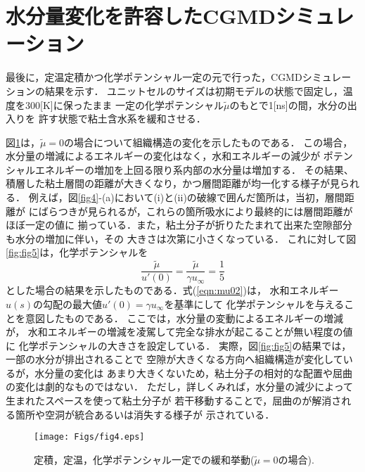\section{水分量変化を許容したCGMDシミュレーション}
最後に，定温定積かつ化学ポテンシャル一定の元で行った，CGMDシミュレーションの結果を示す．
ユニットセルのサイズは初期モデルの状態で固定し，温度を300[K]に保ったまま
一定の化学ポテンシャル$\tilde \mu$のもとで1[ns]の間，水分の出入りを
許す状態で粘土含水系を緩和させる．

図\ref{fig:fig4}は，$\tilde \mu=0$の場合について組織構造の変化を示したものである．
この場合，水分量の増減によるエネルギーの変化はなく，水和エネルギーの減少が
ポテンシャルエネルギーの増加を上回る限り系内部の水分量は増加する．
その結果、積層した粘土層間の距離が大きくなり，かつ層間距離が均一化する様子が見られる．
例えば，図\ref{fig4}-(a)において(i)と(ii)の破線で囲んだ箇所は，当初，層間距離が
にばらつきが見られるが，これらの箇所吸水により最終的には層間距離がほぼ一定の値に
揃っている．また，粘土分子が折りたたまれて出来た空隙部分も水分の増加に伴い，その
大きさは次第に小さくなっている．
%
これに対して図\ref{fig:fig5}は，化学ポテンシャルを
\begin{equation}
	\frac{\tilde \mu}{u'(0)}=
	\frac{\tilde \mu}{\gamma u_\infty}=\frac{1}{5}
	\label{eqn:mu02}
\end{equation}
とした場合の結果を示したものである．式(\ref{eqn:mu02})は，
水和エネルギー$u(s)$の勾配の最大値$u'(0)=\gamma u_{\infty}$を基準にして
化学ポテンシャルを与えることを意図したものである．
ここでは，水分量の変動によるエネルギーの増減が，
水和エネルギーの増減を凌駕して完全な排水が起こることが無い程度の値に
化学ポテンシャルの大きさを設定している．
実際，図\ref{fig:fig5}の結果では，一部の水分が排出されることで
空隙が大きくなる方向へ組織構造が変化しているが，水分量の変化は
あまり大きくないため，粘土分子の相対的な配置や屈曲の変化は劇的なものではない．
ただし，詳しくみれば，水分量の減少によって生まれたスペースを使って粘土分子が
若干移動することで，屈曲のが解消される箇所や空洞が統合あるいは消失する様子が
示されている．
\begin{figure}[h]
	\begin{center}
	\texttt{[image: Figs/fig4.eps]} 
	\end{center}
	\caption{
		定積，定温，化学ポテンシャル一定での緩和挙動($\tilde \mu =0$の場合).
	} 
	\label{fig:fig4}
\end{figure}

